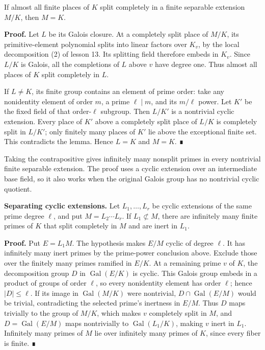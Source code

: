 \documentclass[11pt,a4paper]{article}
\begin{document}
If almost all finite places of \(K\) split completely in a finite
separable extension \(M/K\), then \(M=K\).

\textbf{Proof.} Let \(L\) be its Galois closure. At a completely split
place of \(M/K\), its primitive-element polynomial splits into linear
factors over \(K_v\), by the local decomposition (2) of lesson 13. Its
splitting field therefore embeds in \(K_v\). Since \(L/K\) is Galois,
all the completions of \(L\) above \(v\) have degree one. Thus almost
all places of \(K\) split completely in \(L\).

If \(L\ne K\), its finite group contains an element of prime order: take
any nonidentity element of order \(m\), a prime \(\ell\mid m\), and its
\(m/\ell\) power. Let \(K'\) be the fixed field of that order-\(\ell\)
subgroup. Then \(L/K'\) is a nontrivial cyclic extension. Every place of
\(K'\) above a completely split place of \(L/K\) is completely split in
\(L/K'\); only finitely many places of \(K'\) lie above the exceptional
finite set. This contradicts the lemma. Hence \(L=K\) and \(M=K\). ∎

Taking the contrapositive gives infinitely many nonsplit primes in every
nontrivial finite separable extension. The proof uses a cyclic extension
over an intermediate base field, so it also works when the original
Galois group has no nontrivial cyclic quotient.

\textbf{Separating cyclic extensions.} Let \(L_1,\ldots,L_r\) be cyclic
extensions of the same prime degree \(\ell\), and put
\(M=L_2\cdots L_r\). If \(L_1\not\subset M\), there are infinitely many
finite primes of \(K\) that split completely in \(M\) and are inert in
\(L_1\).

\textbf{Proof.} Put \(E=L_1M\). The hypothesis makes \(E/M\) cyclic of
degree \(\ell\). It has infinitely many inert primes by the prime-power
conclusion above. Exclude those over the finitely many primes ramified
in \(E/K\). At a remaining prime \(v\) of \(K\), the decomposition group
\(D\) in \(\operatorname{Gal}(E/K)\) is cyclic. This Galois group embeds
in a product of groups of order \(\ell\), so every nonidentity element
has order \(\ell\); hence \(|D|\leq\ell\). If its image in
\(\operatorname{Gal}(M/K)\) were nontrivial,
\(D\cap\operatorname{Gal}(E/M)\) would be trivial, contradicting the
selected prime's inertness in \(E/M\). Thus \(D\) maps trivially to the
group of \(M/K\), which makes \(v\) completely split in \(M\), and
\(D=\operatorname{Gal}(E/M)\) maps nontrivially to
\(\operatorname{Gal}(L_1/K)\), making \(v\) inert in \(L_1\). Infinitely
many primes of \(M\) lie over infinitely many primes of \(K\), since
every fiber is finite. ∎
\end{document}
